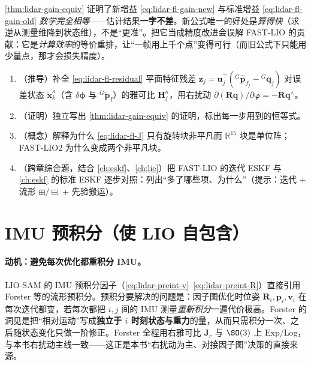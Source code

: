 \begin{pitfall}
\cref{thm:lidar-gain-equiv} 证明了新增益 \cref{eq:lidar-fl-gain-new} 与标准增益 \cref{eq:lidar-fl-gain-old} \emph{数学完全相等}——估计结果\textbf{一字不差}。新公式唯一的好处是\emph{算得快}（求逆从测量维降到状态维），不是“更准”。把它当成精度改进会误解 FAST-LIO 的贡献：它是\emph{计算效率}的等价重排，让“一帧用上千个点”变得可行（而旧公式下只能用少量点，那才会损失精度）。
\end{pitfall}

\begin{practice}
\begin{enumerate}
  \item （推导）补全 \cref{eq:lidar-fl-residual} 平面特征残差 $\mathbf{z}_j=\mathbf{u}_j^\top({}^G\hat{\mathbf{p}}_{f_j}-{}^G\mathbf{q}_j)$ 对误差状态 $\tilde{\mathbf{x}}^\kappa_k$（含 $\delta\boldsymbol{\phi}$ 与 ${}^G\tilde{\mathbf{p}}_I$）的雅可比 $\mathbf{H}^\kappa_j$，用右扰动 $\partial(\mathbf{R}\mathbf{q})/\partial\boldsymbol{\varphi}=-\mathbf{R}\mathbf{q}^\wedge$。
  \item （证明）独立写出 \cref{thm:lidar-gain-equiv} 的证明，标出每一步用到的恒等式。
  \item （概念）解释为什么 \cref{eq:lidar-fl-J} 只有旋转块非平凡而 $\mathbb{R}^{15}$ 块是单位阵；FAST-LIO2 为什么变成两个非平凡块。
  \item （跨章综合题，结合 \cref{ch:eskf}、\cref{ch:lie}）把 FAST-LIO 的迭代 ESKF 与 \cref{ch:eskf} 的标准 ESKF 逐步对照：列出“多了哪些项、为什么”（提示：迭代 + 流形 $\boxplus/\boxminus$ + 先验搬运）。
\end{enumerate}
\end{practice}

\section{IMU 预积分（使 LIO 自包含）}
\label{sec:lidar-preint}

\paragraph{动机：避免每次优化都重积分 IMU。}
LIO-SAM 的 IMU 预积分因子（\cref{eq:lidar-preint-v}–\cref{eq:lidar-preint-R}）直接引用 Forster 等的流形预积分\cite{forster2017preintegration}。预积分要解决的问题是：因子图优化时位姿 $\mathbf{R}_i,\mathbf{p}_i,\mathbf{v}_i$ 在每次迭代都变，若每次都把 $i,j$ 间的 IMU 测量\emph{重新积分}一遍代价极高。Forster 的洞见是把“相对运动”写成\textbf{独立于 $i$ 时刻状态与重力}的量，从而只需积分一次、之后随状态变化只做一阶修正。Forster 全程用右雅可比 $\mathbf{J}_r$ 与 $\SO(3)$ 上 $\mathrm{Exp/Log}$，与本书右扰动主线一致——这正是本书“右扰动为主、对接因子图”决策的直接来源。

